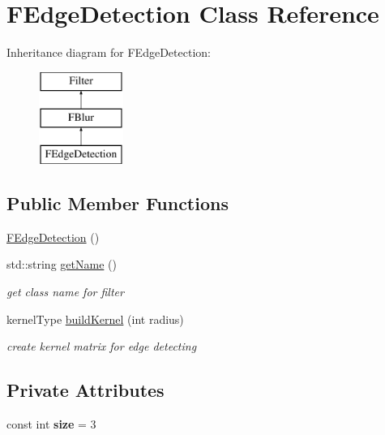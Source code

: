 \hypertarget{classFEdgeDetection}{}\section{F\+Edge\+Detection Class Reference}
\label{classFEdgeDetection}
Inheritance diagram for F\+Edge\+Detection\+:\begin{figure}[H]
\begin{center}
\leavevmode
\includegraphics[height=3.000000cm]{classFEdgeDetection}
\end{center}
\end{figure}
\subsection*{Public Member Functions}
\begin{DoxyCompactItemize}
\item 
\hyperlink{classFEdgeDetection_a61d17b41dd0dc652073b10e3095785e5}{F\+Edge\+Detection} ()
\item 
std\+::string \hyperlink{classFEdgeDetection_acdf7ec56e2f1f5010b84ebcd66a958f3}{get\+Name} ()\hypertarget{classFEdgeDetection_acdf7ec56e2f1f5010b84ebcd66a958f3}{}\label{classFEdgeDetection_acdf7ec56e2f1f5010b84ebcd66a958f3}

\begin{DoxyCompactList}\small\item\em get class name for filter \end{DoxyCompactList}\item 
kernel\+Type \hyperlink{classFEdgeDetection_a58c541bf60eb4e21bdb656bdad5f8c65}{build\+Kernel} (int radius)\hypertarget{classFEdgeDetection_a58c541bf60eb4e21bdb656bdad5f8c65}{}\label{classFEdgeDetection_a58c541bf60eb4e21bdb656bdad5f8c65}

\begin{DoxyCompactList}\small\item\em create kernel matrix for edge detecting \end{DoxyCompactList}\end{DoxyCompactItemize}
\subsection*{Private Attributes}
\begin{DoxyCompactItemize}
\item 
const int {\bfseries size} = 3\hypertarget{classFEdgeDetection_a33956c80b380d6633182e6c4527ed3d3}{}\label{classFEdgeDetection_a33956c80b380d6633182e6c4527ed3d3}

\end{DoxyCompactItemize}


